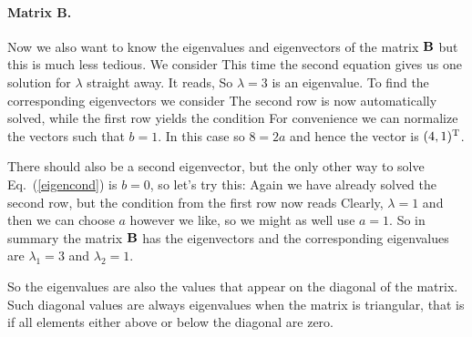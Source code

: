 \paragraph{Matrix B.} Now we also want to know the eigenvalues and eigenvectors of the matrix $\bf B$ but this is much less tedious. We consider
This time the second equation gives us one solution for $\lambda$ straight away. It reads, 
So $\lambda=3$ is an eigenvalue. To find the corresponding eigenvectors we consider  
The second row is now automatically solved, while the first row yields the condition 
For convenience we can normalize the vectors such that $b=1$. In this case 
so $8=2a$ and hence the vector is $(4,1)^{\rm T}$. 

There should also be a second eigenvector, but the only other way to solve Eq.~(\ref{eigencond}) is $b=0$, so let's try this:
Again we have already solved the second row, but the condition from the first row now reads
Clearly, $\lambda=1$ and then we can choose $a$ however we like, so we might as well use $a=1$. So in summary the matrix ${\bf B}$ has the eigenvectors 
and the corresponding eigenvalues are $\lambda_1 = 3$ and $\lambda_2=1$.

So the eigenvalues are also the values that appear on the diagonal of the matrix. Such diagonal values are always eigenvalues when the matrix is triangular, that is if all elements either above or below the diagonal are zero. 

